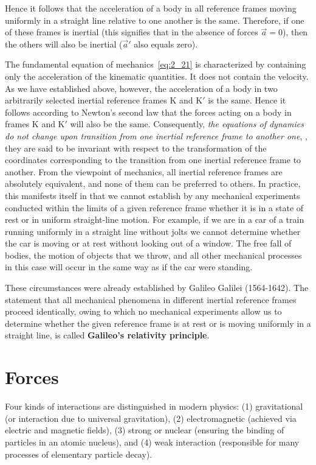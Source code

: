\noindent
Hence it follows that the acceleration of a body in all reference frames moving uniformly in a straight line relative to one another is the same. Therefore, if one of these frames is inertial (this signifies that in the absence of forces $\vec{a}=0$), then the others will also be inertial ($\vec{a}'$ also equals zero).

The fundamental equation of mechanics~\eqref{eq:2_21} is characterized by containing only the acceleration of the kinematic quantities. It does not contain the velocity. As we have established above, however, the acceleration of a body in two arbitrarily selected inertial reference frames K and K$'$ is the same. Hence it follows according to Newton's second law that the forces acting on a body in frames K and K$'$ will also be the same. Consequently, \textit{the equations of dynamics do not change upon transition from one inertial reference frame to another one}, \ie, they are said to be invariant with respect to the transformation of the coordinates corresponding to the transition from one inertial reference frame to another. From the viewpoint of mechanics, all inertial reference frames are absolutely equivalent, and none of them can be preferred to others. In practice, this manifests itself in that we cannot establish by any mechanical experiments conducted within the limits of a given reference frame whether it is in a state of rest or in uniform straight-line motion. For example, if we are in a car of a train running uniformly in a straight line without jolts we cannot determine whether the car is moving or at rest without looking out of a window. The free fall of bodies, the motion of objects that we throw, and all other mechanical processes in this case will occur in the same way as if the car were standing.

These circumstances were already established by Galileo Galilei (1564-1642). The statement that all mechanical phenomena in different inertial reference frames proceed identically, owing to which no mechanical experiments allow us to determine whether the given reference frame is at rest or is moving uniformly in a straight line, is called \textbf{Galileo's relativity principle}.

\section{Forces}\label{sec:2_8}

Four kinds of interactions are distinguished in modern physics: (1) gravitational (or interaction due to universal gravitation), (2) electromagnetic (achieved via electric and magnetic fields), (3) strong or nuclear (ensuring the binding of particles in an atomic nucleus), and (4) weak interaction (responsible for many processes of elementary particle decay).

